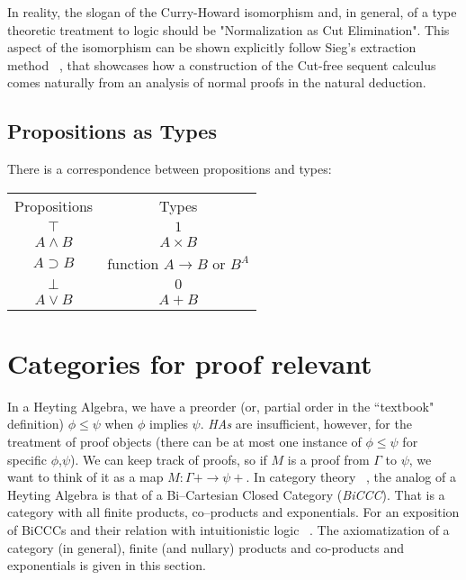 In reality, the slogan of the Curry-Howard isomorphism and, in general, of a type theoretic treatment to logic should be "Normalization as Cut Elimination". This aspect of the isomorphism can be shown explicitly follow Sieg's extraction method ~\cite{Sieg1998}, that  showcases how a construction of the Cut-free sequent calculus comes naturally from an analysis of normal proofs in the natural deduction. 

 
\subsection{Propositions as Types}



There is a correspondence between propositions and types:
\begin{center}
  \begin{tabular}{@{} cc @{}}

    Propositions & Types \\

    $\top$ & $1$ \\
    $A\wedge B$ & $A\times B$ \\
    $A\supset B$ & function $A\to B$ or $B^A$ \\
    $\bot$ & $0$ \\
    $A\vee B$ & $A+B$\\

  \end{tabular}
\end{center}



\section{Categories for proof relevant }

In a Heyting Algebra, we have a preorder (or, partial order in the ``textbook" definition) $\phi\leq \psi$ when $\phi$ implies $\psi$. \emph{HAs} are insufficient, however, for the treatment of proof objects (there can be at most one instance of $\phi\leq\psi$ for specific $\phi$,$\psi$). We can  keep track of proofs, so if $M$ is a proof from  $\Gamma$ to $\psi$, we want to think of it as a map $M:\Gamma+\to \psi+$. In category theory ~\cite{awodey2010category}, the analog of a Heyting Algebra is that of a Bi--Cartesian Closed Category (\emph{BiCCC}). That is a category with all finite products, co--products and exponentials. For an exposition of BiCCCs and their relation with intuitionistic logic ~\cite{Lambek1985}. The axiomatization of a category (in general), finite (and nullary) products and co-products and exponentials is given in this section. 

